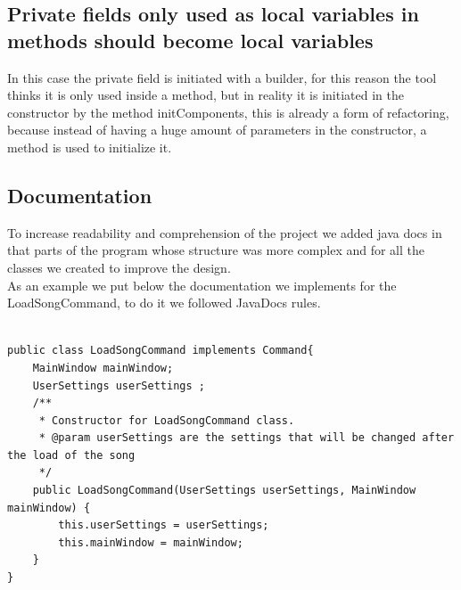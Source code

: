 \documentclass{article}
\begin{document}
\subsection{Private fields only used as local variables in methods should become local variables}

In this case the private field is initiated with a builder, for this reason the tool thinks it is only used inside a method, but in reality it is initiated in the constructor by the method initComponents, this is already a form of refactoring, because instead of having a huge amount of parameters in the constructor, a method is used to initialize it.

\subsection{Documentation}
To increase readability and comprehension of the project we added java docs in that parts of the program whose structure was more complex and for all the classes we created to improve the design.\\
As an example we put below the documentation we implements for the LoadSongCommand, to do it we followed JavaDocs rules.

\begin{lstlisting}[caption={Adding JavaDocs},captionpos=b]

public class LoadSongCommand implements Command{
    MainWindow mainWindow;
    UserSettings userSettings ;
    /**
     * Constructor for LoadSongCommand class.
     * @param userSettings are the settings that will be changed after the load of the song
     */
    public LoadSongCommand(UserSettings userSettings, MainWindow mainWindow) {
        this.userSettings = userSettings;
        this.mainWindow = mainWindow;
    }
}
\end{lstlisting}

\end{document}
